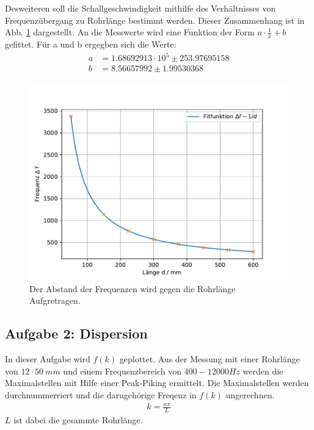 \FloatBarrier
Desweiteren soll die Schallgeschwindigkeit mithilfe des Verhältnisses von Frequenzübergang zu Rohrlänge bestimmt werden.
Dieser Zusammenhang ist in Abb. \ref{fig.1/x} dargestellt.
An die Messwerte wird eine Funktion der Form $a\cdot\frac{1}{x}+b$ gefittet.
Für a und b ergegben sich die Werte:
\begin{align*}
  a&=1.68692913\cdot10^5\pm253.97695158\\
  b&=8.56657992\pm1.99530368\\
\end{align*}
\begin{figure}[h!]
  \centering
  \includegraphics[width=\textwidth]{geschi.pdf}
  \caption{Der Abstand der Frequenzen wird gegen die Rohrlänge Aufgretragen.}
  \label{fig.1/x}
\end{figure}
\FloatBarrier

\subsection{Aufgabe 2: Dispersion}
In dieser Aufgabe wird $f(k)$ geplottet.
Aus der Messung mit einer Rohrlänge von $12\cdot\SI{50}{mm}$ und einem Frequenzbereich von $400-12000\si{Hz}$ werden die Maximalstellen mit Hilfe einer Peak-Piking ermittelt.
Die Maximalstellen werden durchnummerriert und die darugehörige Freqenz in $f(k)$ ungerechnen.
\begin{align}
  k= \frac{n \pi}{L}
\end{align}
$L$ ist dabei die gesammte Rohrlänge.

